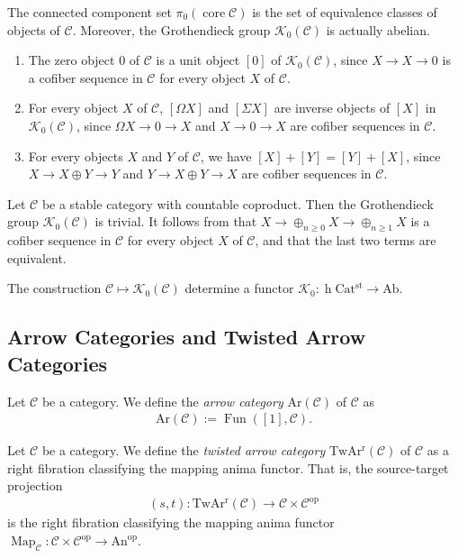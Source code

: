 \documentclass[a4paper,dvipdfmx,11pt,reqno]{amsart}
\DeclareMathOperator{\Map}{Map}
\DeclareMathOperator{\myop}{op}
\DeclareMathOperator{\h}{h}
\DeclareMathOperator{\Fun}{Fun}
\DeclareMathOperator{\core}{core}
\newcommand{\C}{\mathcal{C}}
\newcommand{\K}{\mathcal{K}}
\newcommand{\An}{\mathrm{An}}
\newcommand{\Catst}{\mathrm{Cat^{st}}}
\newcommand{\Ar}{\mathrm{Ar}}
\newcommand{\TwArr}{\mathrm{TwAr^{r}}}
\begin{document}
\begin{remark}
  The connected component set $\pi_0(\core\C)$ is the set of equivalence classes of objects of $\C$.
  Moreover, the Grothendieck group $\K_0(\C)$ is actually abelian.
  \begin{enumerate}
    \item The zero object $0$ of $\C$ is a unit object $[0]$ of $\K_0(\C)$, since $X \to X \to 0$ is a cofiber sequence in $\C$ for every object $X$ of $\C$.
    \item For every object $X$ of $\C$, $[\Omega X]$ and $[\Sigma X]$ are inverse objects of $[X]$ in $\K_0(\C)$, since $\Omega X \to 0 \to X$ and $X \to 0 \to X$ are cofiber sequences in $\C$.
    \item For every objects $X$ and $Y$ of $\C$, we have $[X]+[Y]=[Y]+[X]$, since $X \to X \oplus Y \to Y$ and $Y \to X \oplus Y \to X$ are cofiber sequences in $\C$.
  \end{enumerate}
\end{remark}

\begin{remark}
  Let $\C$ be a stable category with countable coproduct.
  Then the Grothendieck group $\K_0(\C)$ is trivial.
  It follows from that $X \to \oplus_{n \geq 0} X \to \oplus_{n \geq 1} X$ is a cofiber sequence in $\C$ for every object $X$ of $\C$, and that the last two terms are equivalent.
\end{remark}

\begin{remark}
  The construction $\C \mapsto \K_0(\C)$ determine a functor $\K_0 : \h\Catst \to \mathrm{Ab}$.
\end{remark}

\subsection{Arrow Categories and Twisted Arrow Categories} %

\begin{definition}
  Let $\C$ be a category.
  We define the \textit{arrow category} $\Ar(\C)$ of $\C$ as 
  \begin{align*}
    \Ar(\C) := \Fun([1],\C).
  \end{align*} 
\end{definition}

\begin{definition}
  Let $\C$ be a category.
  We define the \textit{twisted arrow category} $\TwArr(\C)$ of $\C$ as a right fibration classifying the mapping anima functor.
  That is, the source-target projection 
  \begin{align*}
    (s,t) : \TwArr(\C) \to \C \times \C^{\myop}
  \end{align*}
  is the right fibration classifying the mapping anima functor $\Map_{\C} : \C \times \C^{\myop} \to \An^{\myop}$.
\end{definition}
\end{document}
